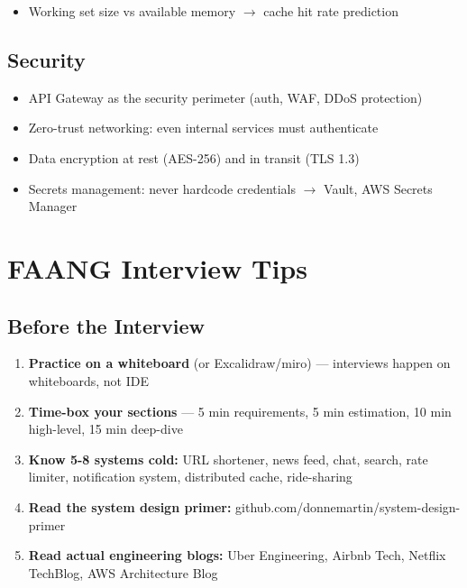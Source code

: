 \documentclass[11pt]{article}
\providecommand{\tightlist}{\setlength{\itemsep}{1pt}\setlength{\parskip}{0pt}}
\begin{document}

\begin{itemize}
\tightlist
\item
  Working set size vs available memory \(\rightarrow\) cache hit rate prediction
\end{itemize}

\subsection{Security}\label{security}

\begin{itemize}
\tightlist
\item
  API Gateway as the security perimeter (auth, WAF, DDoS protection)
\item
  Zero-trust networking: even internal services must authenticate
\item
  Data encryption at rest (AES-256) and in transit (TLS 1.3)
\item
  Secrets management: never hardcode credentials \(\rightarrow\) Vault, AWS Secrets Manager
\end{itemize}

\section{FAANG Interview Tips}\label{faang-interview-tips}

\subsection{Before the Interview}\label{before-the-interview}

\begin{enumerate}
\def\labelenumi{\arabic{enumi}.}
\tightlist
\item
  \textbf{Practice on a whiteboard} (or Excalidraw/miro) --- interviews happen on whiteboards, not IDE
\item
  \textbf{Time-box your sections} --- 5 min requirements, 5 min estimation, 10 min high-level, 15 min deep-dive
\item
  \textbf{Know 5-8 systems cold:} URL shortener, news feed, chat, search, rate limiter, notification system, distributed cache, ride-sharing
\item
  \textbf{Read the system design primer:} github.com/donnemartin/system-design-primer
\item
  \textbf{Read actual engineering blogs:} Uber Engineering, Airbnb Tech, Netflix TechBlog, AWS Architecture Blog
\end{enumerate}
\end{document}

